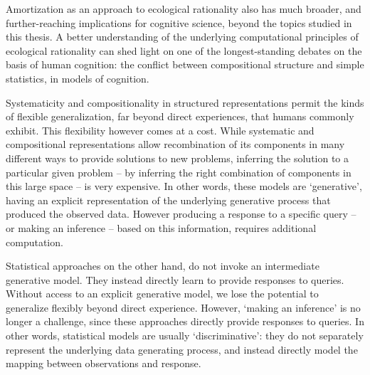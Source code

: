 Amortization as an approach to ecological rationality also has much broader, and further-reaching implications for cognitive science, beyond the topics studied in this thesis. A better understanding of the underlying computational principles of ecological rationality can shed light on one of the longest-standing debates on the basis of human cognition: the conflict between compositional structure and simple statistics, in models of cognition.

Systematicity and compositionality\citep{fodor88} in structured representations permit the kinds of flexible generalization, far beyond direct experiences, that humans commonly exhibit. \citep{griffiths2006, shepard1987toward, wu2018generalization, schulz2017compositional}%
This flexibility however comes at a cost. While systematic and compositional representations allow recombination of its components in many different ways to provide solutions to new problems, inferring the solution to a particular given problem – by inferring the right combination of components in this large space – is very expensive. In other words, these models are `generative', having an explicit representation of the underlying generative process that produced the observed data. However producing a response to a specific query -- or making an inference -- based on this information, requires additional computation.

Statistical approaches\citep{rogers2004semantic, mcclelland2010letting} on the other hand, do not invoke an intermediate generative model. They instead directly learn to provide responses to queries. Without access to an explicit generative model, we lose the potential to generalize flexibly beyond direct experience. However, `making an inference' is no longer a challenge, since these approaches directly provide responses to queries. In other words, statistical models are usually `discriminative': they do not separately represent the underlying data generating process, and instead directly model the mapping between observations and response.

